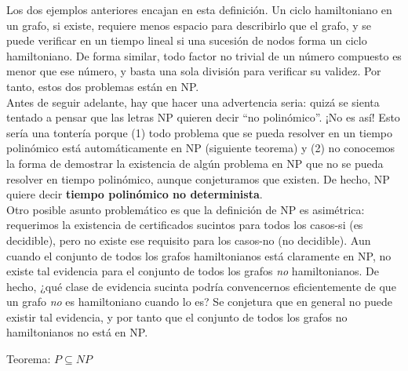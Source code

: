 Los dos ejemplos anteriores encajan en esta definición. Un ciclo hamiltoniano en un grafo, si existe, requiere menos espacio para describirlo que el grafo, y se puede verificar en un tiempo lineal si una sucesión de nodos forma un ciclo hamiltoniano. De forma similar, todo factor no trivial de un número compuesto es menor que ese número, y basta una sola división para verificar su validez. Por tanto, estos dos problemas están en NP.\\

Antes de seguir adelante, hay que hacer una advertencia seria: quizá se sienta tentado a pensar que las letras NP quieren decir ``no polinómico''. ¡No es así! Esto sería una tontería porque (1) todo problema que se pueda resolver en un tiempo polinómico está automáticamente en NP (siguiente teorema) y (2) no conocemos la forma de demostrar la existencia de algún problema en NP que no se pueda resolver en tiempo polinómico, aunque conjeturamos que existen. De hecho, NP quiere decir \textbf{tiempo polinómico no determinista}.\\

Otro posible asunto problemático es que la definición de NP es asimétrica: requerimos la existencia de certificados sucintos para todos los casos-si (es decidible), pero no existe ese requisito para los casos-no (no decidible). Aun cuando el conjunto de todos los grafos hamiltonianos está claramente en NP, no existe tal evidencia para el conjunto de todos los grafos \emph{no} hamiltonianos. De hecho, ¿qué clase de evidencia sucinta podría convencernos eficientemente de que un grafo \emph{no} es hamiltoniano cuando lo es? Se conjetura que en general no puede existir tal evidencia, y por tanto que el conjunto de todos los grafos no hamiltonianos no está en NP.

\begin{fondo}
Teorema: $P \subseteq NP$
\end{fondo}


